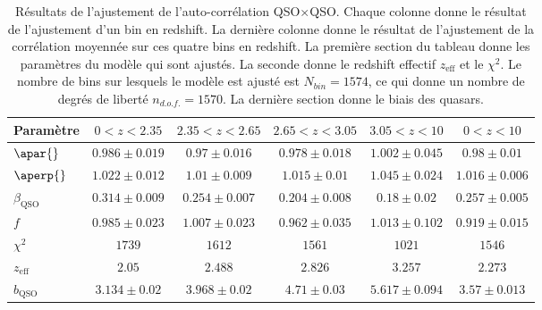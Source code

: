 \begin{table}[h]
  \centering
  \caption{Résultats de l'ajustement de l'auto-corrélation QSO$\times$QSO. Chaque colonne donne le résultat de l'ajustement d'un bin en redshift. La dernière colonne donne le résultat de l'ajustement de la corrélation moyennée sur ces quatre bins en redshift. La première section du tableau donne les paramètres du modèle qui sont ajustés. La seconde donne le redshift effectif $z_{\mathrm{eff}}$  et le $\chi^2$. Le nombre de bins sur lesquels le modèle est ajusté est $N_{bin} = \num{1574}$, ce qui donne un nombre de degrés de liberté $n_{d.o.f.} = \num{1570}$. La dernière section donne le biais des quasars.}
  \label{tab:auto_qso_4bins}
  \begin{tabular}{lccccc}
\toprule
Param\`etre  & $\num{0} < z < \num{2.35}$ & $\num{2.35} < z < \num{2.65}$ & $\num{2.65} < z < \num{3.05}$ & $\num{3.05} < z < \num{10}$  & $\num{0} < z < \num{10}$ \\
\midrule
$\apar{} $ & $ 0.986 \pm 0.019$ & $ 0.97 \pm 0.016$ & $ 0.978 \pm 0.018$ & $ 1.002 \pm 0.045$ & $ 0.98 \pm 0.01$ \\
$\aperp{} $ & $ 1.022 \pm 0.012$ & $ 1.01 \pm 0.009$ & $ 1.015 \pm 0.01$ & $ 1.045 \pm 0.024$ & $ 1.016 \pm 0.006$ \\
$\beta_{\mathrm{QSO}} $ & $ 0.314 \pm 0.009$ & $ 0.254 \pm 0.007$ & $ 0.204 \pm 0.008$ & $ 0.18 \pm 0.02$ & $ 0.257 \pm 0.005$ \\
$f$ & $ 0.985 \pm 0.023$ & $ 1.007 \pm 0.023$ & $ 0.962 \pm 0.035$ & $ 1.013 \pm 0.102$ & $ 0.919 \pm 0.015$ \\
\midrule
$\chi^2$ & $ 1739 $ & $ 1612 $ & $ 1561 $ & $ 1021 $ & $ 1546 $ \\
$z_{\mathrm{eff}}$ & $ 2.05 $ & $ 2.488 $ & $ 2.826 $ & $ 3.257 $ & $ 2.273 $ \\
\midrule
$b_{\mathrm{QSO}} $ & $ 3.134 \pm 0.02$ & $ 3.968 \pm 0.02$ & $ 4.71 \pm 0.03$ & $ 5.617 \pm 0.094$ & $ 3.57 \pm 0.013$ \\
\bottomrule
  \end{tabular}
\end{table}
